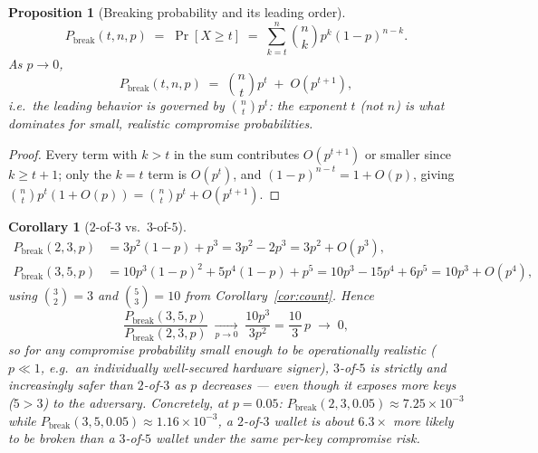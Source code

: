 \documentclass[11pt,a4paper]{article}
\theoremstyle{plain}
\newtheorem{proposition}[theorem]{Proposition}
\newtheorem{corollary}[theorem]{Corollary}
\theoremstyle{definition}
\begin{document}
\begin{proposition}[Breaking probability and its leading order]\label{prop:break-prob}
\begin{equation}
    P_{\mathrm{break}}(t,n,p)\;=\;\Pr[X\ge t]\;=\;\sum_{k=t}^{n}\binom{n}{k}p^k(1-p)^{n-k}.
\end{equation}
As $p\to0$,
\begin{equation}\label{eq:leading-order}
    P_{\mathrm{break}}(t,n,p)\;=\;\binom{n}{t}p^{t}\;+\;O(p^{t+1}),
\end{equation}
i.e.\ the leading behavior is governed by $\binom{n}{t}p^t$: the exponent $t$
(not $n$) is what dominates for small, realistic compromise probabilities.
\end{proposition}

\begin{proof}
Every term with $k>t$ in the sum contributes $O(p^{t+1})$ or smaller since
$k\ge t+1$; only the $k=t$ term is $O(p^t)$, and
$(1-p)^{n-t}=1+O(p)$, giving $\binom{n}{t}p^t(1+O(p))=\binom{n}{t}p^t+O(p^{t+1})$.
\end{proof}

\begin{corollary}[$2$-of-$3$ vs.\ $3$-of-$5$]\label{cor:2of3v3of5}
\begin{align}
    P_{\mathrm{break}}(2,3,p) &= 3p^2(1-p)+p^3 = 3p^2-2p^3 = 3p^2+O(p^3),\\
    P_{\mathrm{break}}(3,5,p) &= 10p^3(1-p)^2+5p^4(1-p)+p^5 = 10p^3-15p^4+6p^5 = 10p^3+O(p^4),
\end{align}
using $\binom{3}{2}=3$ and $\binom{5}{3}=10$ from Corollary~\ref{cor:count}.
Hence
\begin{equation}
    \frac{P_{\mathrm{break}}(3,5,p)}{P_{\mathrm{break}}(2,3,p)}
    \;\xrightarrow[p\to0]{}\;\frac{10p^3}{3p^2}=\frac{10}{3}\,p\;\longrightarrow\;0,
\end{equation}
so for any compromise probability small enough to be operationally realistic
($p\ll1$, e.g.\ an individually well-secured hardware signer), $3$-of-$5$ is
\emph{strictly and increasingly} safer than $2$-of-$3$ as $p$ decreases ---
even though it exposes \emph{more} keys ($5>3$) to the adversary. Concretely,
at $p=0.05$: $P_{\mathrm{break}}(2,3,0.05)\approx7.25\times10^{-3}$ while
$P_{\mathrm{break}}(3,5,0.05)\approx1.16\times10^{-3}$, a $2$-of-$3$ wallet is
about $6.3\times$ more likely to be broken than a $3$-of-$5$ wallet under the
same per-key compromise risk.
\end{corollary}
\end{document}
